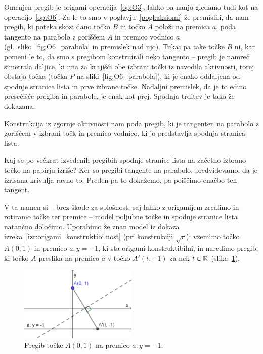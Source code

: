 Omenjen pregib je origami operacija~\ref{op:O3}, lahko pa nanjo gledamo tudi kot na operacijo~\ref{op:O6}. Za le-to smo v poglavju~\ref{pogl:aksiomi} že premislili, da nam pregib, ki poteka skozi dano točko $B$ in točko $A$ položi na premica $a$, poda tangento na parabolo z goriščem $A$ in premico vodnico $a$ (gl.\ sliko~\ref{fig:O6_parabola} in premislek nad njo). Tukaj pa take točke $B$ ni, kar pomeni le to, da smo s pregibom konstruirali neko tangento -- pregib je namreč simetrala daljice, ki ima za krajišči obe izbrani točki iz navodila aktivnosti, torej obstaja točka (točka $P$ na sliki~\ref{fig:O6_parabola}), ki je enako oddaljena od spodnje stranice lista in prve izbrane točke. Nadaljni premislek, da je to edino presečišče pregiba in parabole, je enak kot prej. Spodnja trditev je tako že dokazana.

\begin{trditev}
    Konstrukcija iz zgornje aktivnosti nam poda pregib, ki je tangenten na parabolo z goriščem v izbrani točk in premico vodnico, ki jo predstavlja spodnja stranica lista.
\end{trditev}

Kaj se po večkrat izvedenih pregibih spodnje stranice lista na začetno izbrano točko na papirju izriše? Ker so pregibi tangente na parabolo, predvidevamo, da je izrisana krivulja ravno to. Preden pa to dokažemo, pa poiščimo enačbo teh tangent.

V ta namen si -- brez škode za splošnost, saj lahko z origamijem zrcalimo in rotiramo točke ter premice -- model poljubne točke in  spodnje stranice lista natančno določimo. Uporabimo že znan model iz dokaza izreka~\ref{izr:origami_konstruktibilnost} (pri konstrukciji $\sqrt{r}$): vzemimo točko $A(0, 1)$ in premico $a: y = -1$, ki sta origami-konstruktibilni, in naredimo pregib, ki točko $A$ preslika na premico $a$ v točko $A'(t, -1)$ za nek $t \in \mathbb R$ (slika~\ref{fig:enacba_tangente_par1}).

\begin{figure}[h]
    \centering
    \includegraphics[width=0.5\textwidth]{images/enacba_parabole1.png}
    \caption[Enačba tangente na parabolo]{Pregib točke $A(0, 1)$ na premico $a: y = -1$.}
    \label{fig:enacba_tangente_par1}
\end{figure}

